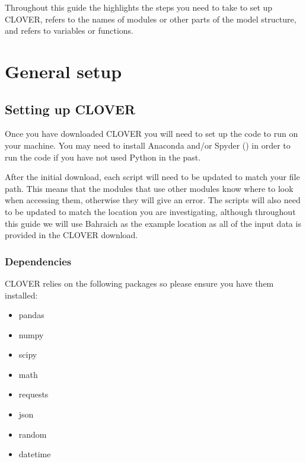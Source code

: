 \documentclass[letterpaper,10pt,english]{sphinxmanual}
\begin{document}
\sphinxAtStartPar
Throughout this guide the  highlights the steps you need
to take to set up CLOVER,  refers to the names of
modules or other parts of the model structure, and 
refers to variables or functions.


\section{General setup}
\label{\detokenize{general_setup:general-setup}}\label{\detokenize{general_setup::doc}}

\subsection{Setting up CLOVER}
\label{\detokenize{general_setup:setting-up-clover}}
\sphinxAtStartPar
Once you have downloaded CLOVER you will need to set up the code to run
on your machine. You may need to install Anaconda and/or Spyder
() in order
to run the code if you have not used Python in the past.

\sphinxAtStartPar
After the initial download, each script will need to be updated to match
your file path. This means that the modules that use other modules know
where to look when accessing them, otherwise they will give an error.
The scripts will also need to be updated to match the location you are
investigating, although throughout this guide we will use Bahraich as
the example location as all of the input data is provided in the CLOVER
download.


\subsubsection{Dependencies}
\label{\detokenize{general_setup:dependencies}}
\sphinxAtStartPar
CLOVER relies on the following packages so please ensure you have them
installed:
\begin{itemize}
\item {} 
\sphinxAtStartPar
pandas

\item {} 
\sphinxAtStartPar
numpy

\item {} 
\sphinxAtStartPar
scipy

\item {} 
\sphinxAtStartPar
math

\item {} 
\sphinxAtStartPar
requests

\item {} 
\sphinxAtStartPar
json

\item {} 
\sphinxAtStartPar
random

\item {} 
\sphinxAtStartPar
datetime

\end{itemize}
\end{document}
